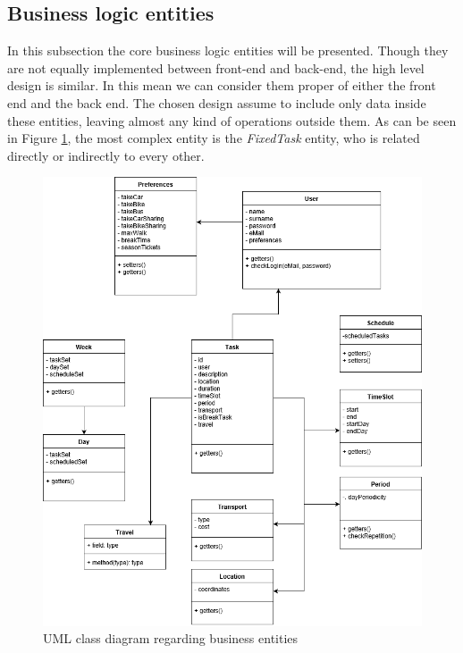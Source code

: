\subsection{Business logic entities}
\label{sec:businessEntities}
In this subsection the core business logic entities will be presented. Though they are not equally implemented between front-end and back-end, the high level design is similar. In this mean we can consider them proper of either the front end and the back end. The chosen design assume to include only data inside these entities, leaving almost any kind of operations outside them. As can be seen in Figure \ref{component:entity_diag}, the most complex entity is the \emph{FixedTask} entity, who is related directly or indirectly to every other.
\begin{figure}[H]
    \centering
    \includegraphics[scale=0.4]{Pictures/ComponentDiagram/EntityDiagram.png}
    \caption{UML class diagram regarding business entities}
    \label{component:entity_diag}
\end{figure}
